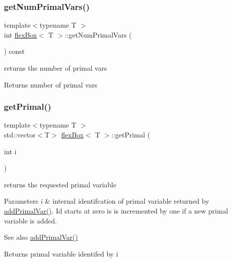 \subsubsection{\texorpdfstring{get\+Num\+Primal\+Vars()}{getNumPrimalVars()}}
{\footnotesize\ttfamily template$<$typename T $>$ \\
int \hyperlink{classflex_box}{flex\+Box}$<$ T $>$\+::get\+Num\+Primal\+Vars (\begin{DoxyParamCaption}{ }\end{DoxyParamCaption}) const\hspace{0.3cm}{\ttfamily [inline]}}



returns the number of primal vars 

\begin{DoxyReturn}{Returns}
number of primal vars 
\end{DoxyReturn}
\mbox{\label{classflex_box_ae1c5100eec86603d23d5116ba8d93e9d}} 
\subsubsection{\texorpdfstring{get\+Primal()}{getPrimal()}}
{\footnotesize\ttfamily template$<$typename T $>$ \\
std\+::vector$<$T$>$ \hyperlink{classflex_box}{flex\+Box}$<$ T $>$\+::get\+Primal (\begin{DoxyParamCaption}\item[{int}]{i }\end{DoxyParamCaption})\hspace{0.3cm}{\ttfamily [inline]}}



returns the requested primal variable 


\begin{DoxyParams}{Parameters}
{\em i} & internal identifcation of primal variable returned by \hyperlink{classflex_box_a659aac107b85ecf64c9fd1aaa465a98d}{add\+Primal\+Var()}. Id starts at zero is is incremented by one if a new primal variable is added. \\
\hline
\end{DoxyParams}
\begin{DoxySeeAlso}{See also}
\hyperlink{classflex_box_a659aac107b85ecf64c9fd1aaa465a98d}{add\+Primal\+Var()} 
\end{DoxySeeAlso}
\begin{DoxyReturn}{Returns}
primal variable identifed by i 
\end{DoxyReturn}
\mbox{\label{classflex_box_a77e4f589d87b7c34170778c9abbea3b3}} 
